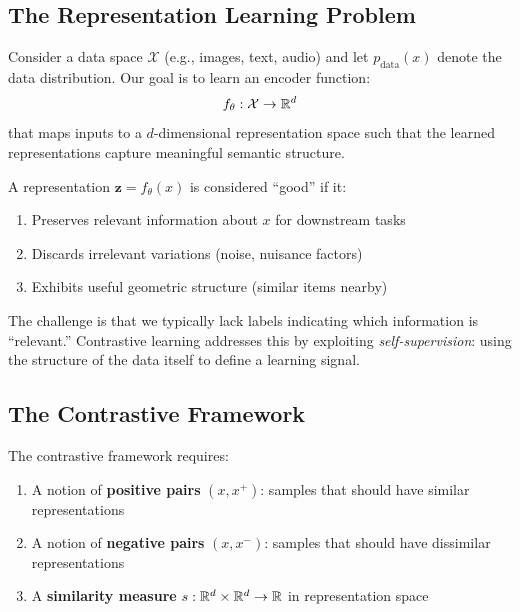 \begin{notechapter}
\subsection{The Representation Learning Problem}

Consider a data space $\mathcal{X}$ (e.g., images, text, audio) and let $p_{\text{data}}(x)$ denote the data distribution. Our goal is to learn an encoder function:
\begin{equation}
f_\theta : \mathcal{X} \to \mathbb{R}^d
\end{equation}
that maps inputs to a $d$-dimensional representation space such that the learned representations capture meaningful semantic structure.

\begin{definition}
A representation $\bm{z} = f_\theta(x)$ is considered ``good'' if it:
\begin{enumerate}[label=(\roman*)]
    \item Preserves relevant information about $x$ for downstream tasks
    \item Discards irrelevant variations (noise, nuisance factors)
    \item Exhibits useful geometric structure (similar items nearby)
\end{enumerate}
\end{definition}

The challenge is that we typically lack labels indicating which information is ``relevant.'' Contrastive learning addresses this by exploiting \emph{self-supervision}: using the structure of the data itself to define a learning signal.

\subsection{The Contrastive Framework}

The contrastive framework requires:
\begin{enumerate}
    \item A notion of \textbf{positive pairs} $(x, x^+)$: samples that should have similar representations
    \item A notion of \textbf{negative pairs} $(x, x^-)$: samples that should have dissimilar representations
    \item A \textbf{similarity measure} $s: \mathbb{R}^d \times \mathbb{R}^d \to \mathbb{R}$ in representation space
\end{enumerate}


\end{notechapter}
